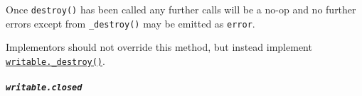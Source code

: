 \begin{Shaded}
\begin{Highlighting}[]
\OperatorTok{=} \NormalTok{(}\NormalTok{)}\OperatorTok{;}

\OperatorTok{=}  \NormalTok{()}\OperatorTok{;}

\NormalTok{()}\OperatorTok{;}
\NormalTok{(}\OperatorTok{,}  \NormalTok{() \{\})}\OperatorTok{;}
\end{Highlighting}
\end{Shaded}

\begin{Shaded}
\begin{Highlighting}[]
\OperatorTok{=} \NormalTok{(}\NormalTok{)}\OperatorTok{;}

\OperatorTok{=}  \NormalTok{()}\OperatorTok{;}
\NormalTok{()}\OperatorTok{;}

\NormalTok{(}\OperatorTok{,}\KeywordTok{=\textgreater{}} \NormalTok{))}\OperatorTok{;}
\end{Highlighting}
\end{Shaded}

Once \texttt{destroy()} has been called any further calls will be a
no-op and no further errors except from \texttt{\_destroy()} may be
emitted as \texttt{\textquotesingle{}error\textquotesingle{}}.

Implementors should not override this method, but instead implement
\hyperref[writable_destroyerr-callback]{\texttt{writable.\_destroy()}}.

\subparagraph{\texorpdfstring{\texttt{writable.closed}}{writable.closed}}\label{writable.closed}


